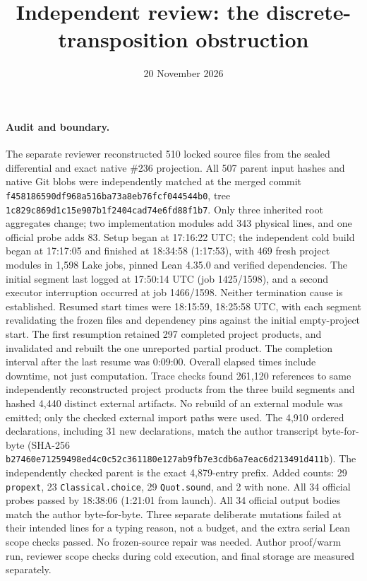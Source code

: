 \documentclass[11pt]{article}
\title{Independent review: the discrete-transposition obstruction}
\author{}
\date{20 November 2026}
\newcommand{\code}[1]{\texttt{#1}}
\begin{document}
\maketitle

\paragraph{Audit and boundary.}
The separate reviewer reconstructed 510 locked source files from the sealed differential and exact native \#236 projection. All 507 parent input hashes and native Git blobs were independently matched at the merged commit \nolinkurl{f458186590df968a516ba73a8eb76fcf044544b0}, tree \nolinkurl{1c829c869d1c15e907b1f2404cad74e6fd88f1b7}. Only three inherited root aggregates change; two implementation modules add 343 physical lines, and one official probe adds 83. Setup began at 17:16:22 UTC; the independent cold build began at 17:17:05 and finished at 18:34:58 (1:17:53), with 469 fresh project modules in 1,598 Lake jobs, pinned Lean 4.35.0 and verified dependencies. The initial segment last logged at 17:50:14 UTC (job 1425/1598), and a second executor interruption occurred at job 1466/1598. Neither termination cause is established. Resumed start times were 18:15:59, 18:25:58 UTC, with each segment revalidating the frozen files and dependency pins against the initial empty-project start. The first resumption retained 297 completed project products, and invalidated and rebuilt the one unreported partial product. The completion interval after the last resume was 0:09:00. Overall elapsed times include downtime, not just computation. Trace checks found 261,120 references to same independently reconstructed project products from the three build segments and hashed 4,440 distinct external artifacts. No rebuild of an external module was emitted; only the checked external import paths were used. The 4,910 ordered declarations, including 31 new declarations, match the author transcript byte-for-byte (SHA-256 \nolinkurl{b27460e71259498ed4c0c52c361180e127ab9fb7e3cdb6a7eac6d213491d411b}). The independently checked parent is the exact 4,879-entry prefix. Added counts: 29 \code{propext}, 23 \code{Classical.choice}, 29 \code{Quot.sound}, and 2 with none. All 34 official probes passed by 18:38:06 (1:21:01 from launch). All 34 official output bodies match the author byte-for-byte. Three separate deliberate mutations failed at their intended lines for a typing reason, not a budget, and the extra serial Lean scope checks passed. No frozen-source repair was needed. Author proof/warm run, reviewer scope checks during cold execution, and final storage are measured separately.
\end{document}

